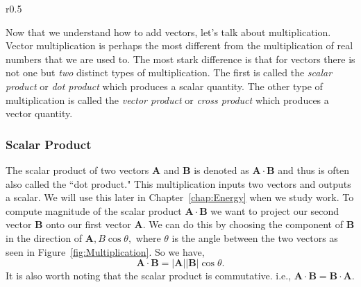 \documentclass[main.tex]{subfiles}
\begin{document}
\begin{wrapfigure}{r}{0.5\textwidth}
\centering
{}
\caption{} \label{fig:Multiplication}
\end{wrapfigure}

Now that we understand how to add vectors, let's talk about multiplication. Vector multiplication is perhaps the most different from the multiplication of real numbers that we are used to. The most stark difference is that for vectors there is not one but \emph{two} distinct types of multiplication. The first is called the \emph{scalar product} or \emph{dot product} which produces a scalar quantity. The other type of multiplication is called the \emph{vector product} or \emph{cross product} which produces a vector quantity.
\subsubsection*{Scalar Product}
The scalar product of two vectors $\mathbf{A}$ and $\mathbf{B}$ is denoted as $\mathbf{A}\cdot\mathbf{B}$ and thus is often also called the ``dot product."  This multiplication inputs two vectors and outputs a scalar. We will use this later in Chapter~\ref{chap:Energy} when we study work. To compute magnitude of the scalar product $\mathbf{A}\cdot\mathbf{B}$ we want to project our second vector $\mathbf{B}$ onto our first vector $\mathbf{A}$. We can do this by choosing the component of $\mathbf{B}$ in the direction of $\mathbf{A}, B\cos\theta,$ where $\theta$ is the angle between the two vectors as seen in Figure~\ref{fig:Multiplication}. So we have,
\begin{equation}
\mathbf{A}\cdot\mathbf{B}=|\mathbf{A}||\mathbf{B}|\cos\theta.
\end{equation}
It is also worth noting that the scalar product is commutative. i.e., $\mathbf{A}\cdot\mathbf{B}=\mathbf{B}\cdot\mathbf{A}.$
\end{document}
